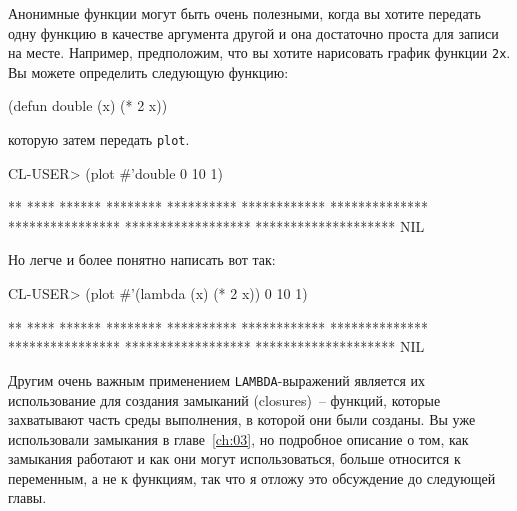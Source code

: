 Анонимные функции могут быть очень полезными, когда вы хотите передать одну функцию в
качестве аргумента другой и она достаточно проста для записи на месте.  Например,
предположим, что вы хотите нарисовать график функции \lstinline{2x}. Вы можете определить
следующую функцию:

\begin{myverb}
(defun double (x) (* 2 x))
\end{myverb}

\noindent{}которую затем передать \lstinline{plot}.

\begin{myverb}
CL-USER> (plot #'double 0 10 1)

**
****
******
********
**********
************
**************
****************
******************
********************
NIL
\end{myverb}

Но легче и более понятно написать вот так:

\begin{myverb}
CL-USER> (plot #'(lambda (x) (* 2 x)) 0 10 1)

**
****
******
********
**********
************
**************
****************
******************
********************
NIL
\end{myverb}

Другим очень важным применением \lstinline{LAMBDA}-выражений является их использование для
создания замыканий (closures)~-- функций, которые захватывают часть среды выполнения, в
которой они были созданы.  Вы уже использовали замыкания в главе~\ref{ch:03}, но подробное
описание о том, как замыкания работают и как они могут использоваться, больше относится к
переменным, а не к функциям, так что я отложу это обсуждение до следующей главы.

